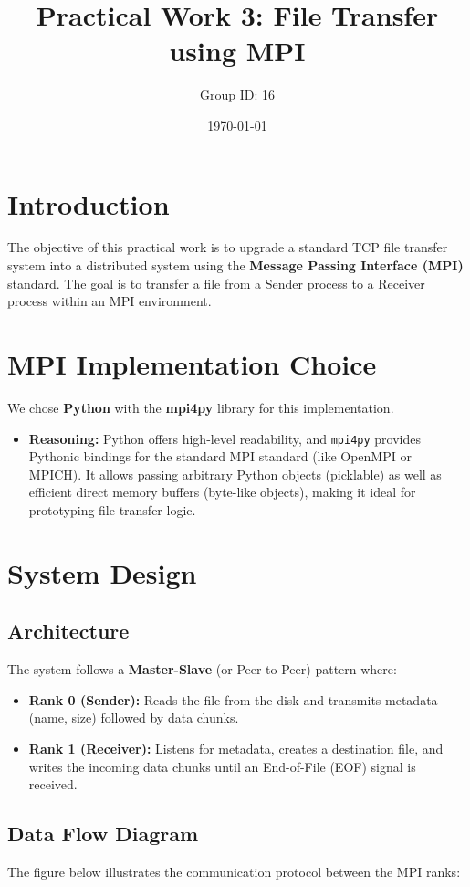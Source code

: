 \documentclass[a4paper,12pt]{article}
\title{\textbf{Practical Work 3: File Transfer using MPI}}
\author{Group ID: 16}
\date{\today}
\begin{document}
\maketitle

\section{Introduction}
The objective of this practical work is to upgrade a standard TCP file transfer system into a distributed system using the \textbf{Message Passing Interface (MPI)} standard. The goal is to transfer a file from a Sender process to a Receiver process within an MPI environment.

\section{MPI Implementation Choice}
We chose \textbf{Python} with the \textbf{mpi4py} library for this implementation. 
\begin{itemize}
    \item \textbf{Reasoning:} Python offers high-level readability, and \texttt{mpi4py} provides Pythonic bindings for the standard MPI standard (like OpenMPI or MPICH). It allows passing arbitrary Python objects (picklable) as well as efficient direct memory buffers (byte-like objects), making it ideal for prototyping file transfer logic.
\end{itemize}

\section{System Design}

\subsection{Architecture}
The system follows a \textbf{Master-Slave} (or Peer-to-Peer) pattern where:
\begin{itemize}
    \item \textbf{Rank 0 (Sender):} Reads the file from the disk and transmits metadata (name, size) followed by data chunks.
    \item \textbf{Rank 1 (Receiver):} Listens for metadata, creates a destination file, and writes the incoming data chunks until an End-of-File (EOF) signal is received.
\end{itemize}

\subsection{Data Flow Diagram}
The figure below illustrates the communication protocol between the MPI ranks:
\end{document}
